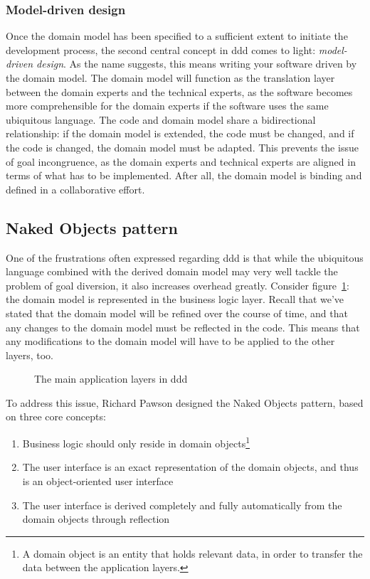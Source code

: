 \subsubsection{Model-driven design}
\label{subsubsection:modeldrivendesign}
Once the domain model has been specified to a sufficient extent to initiate the development process, the second central concept in \acrshort{ddd} comes to light: \textit{model-driven design}. As the name suggests, this means writing your software driven by the domain model. The domain model will function as the translation layer between the domain experts and the technical experts, as the software becomes more comprehensible for the domain experts if the software uses the same ubiquitous language. The code and domain model share a bidirectional relationship: if the domain model is extended, the code must be changed, and if the code is changed, the domain model must be adapted\cite{evans2004domain}. This prevents the issue of goal incongruence, as the domain experts and technical experts are aligned in terms of what has to be implemented. After all, the domain model is binding and defined in a collaborative effort.

\subsection{Naked Objects pattern}
\label{subsection:nakedobjectspattern}
One of the frustrations often expressed regarding \acrshort{ddd} is that while the ubiquitous language combined with the derived domain model may very well tackle the problem of goal diversion, it also increases overhead greatly. Consider figure~\ref{figure:applicationlayers}: the domain model is represented in the business logic layer. Recall that we've stated that the domain model will be refined over the course of time, and that any changes to the domain model must be reflected in the code. This means that any modifications to the domain model will have to be applied to the other layers, too.

\begin{figure}[h]
	\center
	
	\caption{The main application layers in \acrshort{ddd}}
	\label{figure:applicationlayers}
\end{figure}

To address this issue, Richard Pawson designed the Naked Objects pattern, based on three core concepts\cite{pawson2002naked}:
\begin{enumerate}
	\item Business logic should only reside in domain objects\footnote{A domain object is an entity that holds relevant data, in order to transfer the data between the application layers.}
	
	\item The user interface is an exact representation of the domain objects, and thus is an object-oriented user interface
	
	\item The user interface is derived completely and fully automatically from the domain objects through reflection
\end{enumerate}

